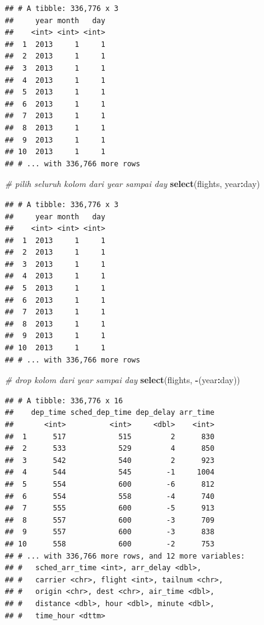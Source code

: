 \documentclass[]{book}
\newenvironment{Shaded}{\begin{snugshade}}{\end{snugshade}}
\newcommand{\KeywordTok}[1]{\textcolor[rgb]{0.13,0.29,0.53}{\textbf{#1}}}
\newcommand{\CommentTok}[1]{\textcolor[rgb]{0.56,0.35,0.01}{\textit{#1}}}
\newcommand{\OperatorTok}[1]{\textcolor[rgb]{0.81,0.36,0.00}{\textbf{#1}}}
\newcommand{\NormalTok}[1]{#1}
\begin{document}
\begin{verbatim}
## # A tibble: 336,776 x 3
##     year month   day
##    <int> <int> <int>
##  1  2013     1     1
##  2  2013     1     1
##  3  2013     1     1
##  4  2013     1     1
##  5  2013     1     1
##  6  2013     1     1
##  7  2013     1     1
##  8  2013     1     1
##  9  2013     1     1
## 10  2013     1     1
## # ... with 336,766 more rows
\end{verbatim}

\begin{Shaded}
\begin{Highlighting}[]
\CommentTok{# pilih seluruh kolom dari year sampai day}
\KeywordTok{select}\NormalTok{(flights, year}\OperatorTok{:}\NormalTok{day)}
\end{Highlighting}
\end{Shaded}

\begin{verbatim}
## # A tibble: 336,776 x 3
##     year month   day
##    <int> <int> <int>
##  1  2013     1     1
##  2  2013     1     1
##  3  2013     1     1
##  4  2013     1     1
##  5  2013     1     1
##  6  2013     1     1
##  7  2013     1     1
##  8  2013     1     1
##  9  2013     1     1
## 10  2013     1     1
## # ... with 336,766 more rows
\end{verbatim}

\begin{Shaded}
\begin{Highlighting}[]
\CommentTok{# drop kolom dari year sampai day}
\KeywordTok{select}\NormalTok{(flights, }\OperatorTok{-}\NormalTok{(year}\OperatorTok{:}\NormalTok{day))}
\end{Highlighting}
\end{Shaded}

\begin{verbatim}
## # A tibble: 336,776 x 16
##    dep_time sched_dep_time dep_delay arr_time
##       <int>          <int>     <dbl>    <int>
##  1      517            515         2      830
##  2      533            529         4      850
##  3      542            540         2      923
##  4      544            545        -1     1004
##  5      554            600        -6      812
##  6      554            558        -4      740
##  7      555            600        -5      913
##  8      557            600        -3      709
##  9      557            600        -3      838
## 10      558            600        -2      753
## # ... with 336,766 more rows, and 12 more variables:
## #   sched_arr_time <int>, arr_delay <dbl>,
## #   carrier <chr>, flight <int>, tailnum <chr>,
## #   origin <chr>, dest <chr>, air_time <dbl>,
## #   distance <dbl>, hour <dbl>, minute <dbl>,
## #   time_hour <dttm>
\end{verbatim}
\end{document}
